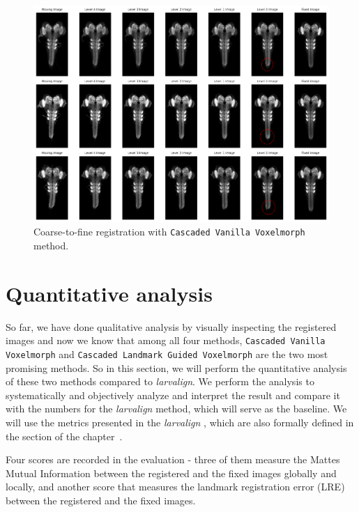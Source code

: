 \documentclass{book}
\begin{document}
	\begin{figure}[h!]
		\centering
		\includegraphics[width=\columnwidth]{resources/chapter4/method4/vanilla/registered_images.png}
		\caption{Coarse-to-fine registration with \texttt{Cascaded Vanilla Voxelmorph} method.}
		\label{fig:method3_combine}
	\end{figure}

	\section{Quantitative analysis} \label{sec:Quantitative}
	So far, we have done qualitative analysis by visually inspecting the registered images and now we know that among all four methods, \texttt{Cascaded Vanilla Voxelmorph} and \texttt{Cascaded Landmark Guided Voxelmorph} are the two most promising methods. So in this section, we will perform the quantitative analysis of these two methods compared to \emph{larvalign}. We perform the analysis to systematically and objectively analyze and interpret the result and compare it with the numbers for the \textit{larvalign} method, which will serve as the baseline. We will use the metrics presented in the \textit{larvalign} \cite{larvalign}, which are also formally defined in the  section of the chapter~.
	
	Four scores are recorded in the evaluation - three of them measure the Mattes Mutual Information between the registered and the fixed images globally and locally, and another score that measures the landmark registration error (LRE) between the registered and the fixed images. 
	
\end{document}
